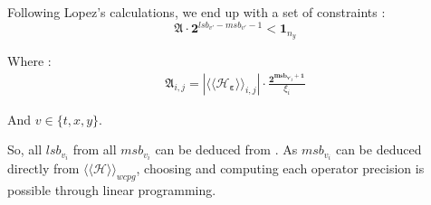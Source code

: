 %
%
%
%
		Following Lopez's calculations, we end up with a set of constraints :
		\begin{equation} \label{constraint}
			\boldsymbol{\mathfrak{A}} \cdot \boldsymbol{2}^{lsb_{v'}-msb_{v'}-1} < \boldsymbol{1}_{n_y}
		\end{equation}

		Where :
		\begin{eqnarray}
			\boldsymbol{\mathfrak{A}}_{i,j}= | \langle\langle \mathcal{H}_{\boldsymbol{\varepsilon}} \rangle\rangle_{i,j} | \cdot \frac{\boldsymbol{2^{msb_{v'_j}+1}}}{\xi_i} %
		\end{eqnarray}

		And $v\in\{t,x,y\}$.

		 So, all $lsb_{v_i}$ from all $msb_{v_i}$ can  be deduced from \label{constraint}.
		As $msb_{v_i}$ can be deduced directly from $\langle\langle \mathcal{H} \rangle\rangle_{wcpg}$, choosing and computing each operator precision is possible through linear programming.


		
